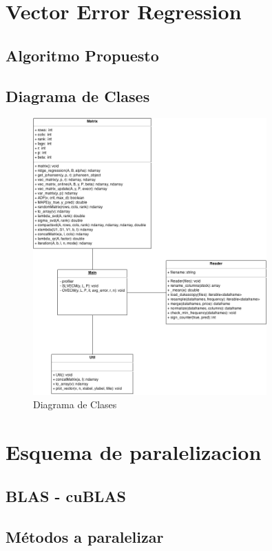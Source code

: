 \section{Vector Error Regression}
\subsection{Algoritmo Propuesto}
\subsection{Diagrama de Clases}

\begin{figure}[h!t]
    \begin{center}
        \includegraphics[width=0.8\textwidth]{images/class_diagram.png}
        \caption{Diagrama de Clases}
        \label{fig:class_diagram}
    \end{center}
\end{figure}

\section{Esquema de paralelizacion}
\subsection{BLAS - cuBLAS}
\subsection{Métodos a paralelizar}
